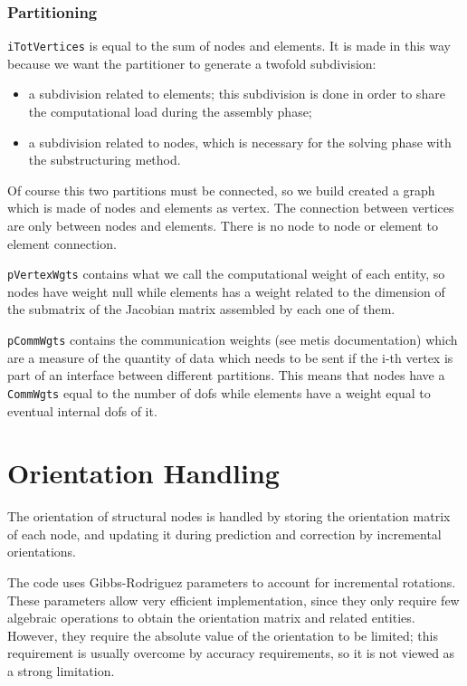 \documentclass[10pt,dvips,fleqn,subeqn]{report}
\begin{document}
\subsection{Partitioning}
\texttt{iTotVertices} is equal to the sum of nodes and elements. 
It is made in this way because we want the partitioner 
to generate a twofold subdivision:
\begin{itemize}
\item a subdivision related to elements; 
this subdivision is done in order to share the computational 
load during the assembly phase;
\item a subdivision related to nodes, 
which is necessary for the solving phase with the substructuring method.
\end{itemize}
Of course this two partitions must be connected, 
so we build created a graph which is made of nodes and elements as vertex. 
The connection between vertices are only between nodes and elements. 
There is no node to node or element to element connection.

\texttt{pVertexWgts} 
contains what we call the computational weight of each entity, 
so nodes have weight null while elements has a weight related to 
the dimension of the submatrix of the Jacobian matrix assembled
by each one of them.

\texttt{pCommWgts} contains the communication weights 
(see metis documentation) which are a measure of the quantity 
of data which needs to be sent if the i-th vertex is part 
of an interface between different partitions. 
This means that nodes have a \texttt{CommWgts} equal to the number 
of dofs while elements have a weight equal to eventual internal dofs of it.


\chapter{Orientation Handling}
The orientation of structural nodes is handled by storing the orientation
matrix of each node, and updating it during prediction and correction 
by incremental orientations.

The code uses Gibbs-Rodriguez parameters to account for incremental 
rotations.
These parameters allow very efficient implementation, since they
only require few algebraic operations to obtain the orientation matrix
and related entities.
However, they require the absolute value of the orientation to be limited;
this requirement is usually overcome by accuracy requirements,
so it is not viewed as a strong limitation.
\end{document}

